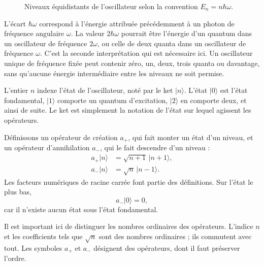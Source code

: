 \begin{figure}[t]
\centering
{}
\caption{Niveaux équidistants de l’oscillateur selon la convention \(E_n=n\hbar\omega\).}
\end{figure}

L’écart \(\hbar\omega\) correspond à l’énergie attribuée précédemment à un photon de fréquence angulaire \(\omega\). La valeur \(2\hbar\omega\) pourrait être l’énergie d’un quantum dans un oscillateur de fréquence \(2\omega\), ou celle de deux quanta dans un oscillateur de fréquence \(\omega\). C’est la seconde interprétation qui est nécessaire ici. Un oscillateur unique de fréquence fixée peut contenir zéro, un, deux, trois quanta ou davantage, sans qu’aucune énergie intermédiaire entre les niveaux ne soit permise.

L’entier \(n\) indexe l’état de l’oscillateur, noté par le ket \(|n\rangle\). L’état \(|0\rangle\) est l’état fondamental, \(|1\rangle\) comporte un quantum d’excitation, \(|2\rangle\) en comporte deux, et ainsi de suite. Le ket est simplement la notation de l’état sur lequel agissent les opérateurs.

Définissons un opérateur de création \(a_+\), qui fait monter un état d’un niveau, et un opérateur d’annihilation \(a_-\), qui le fait descendre d’un niveau :
\begin{align}
a_+|n\rangle &= \sqrt{n+1}\,|n+1\rangle,\\
a_-|n\rangle &= \sqrt{n}\,|n-1\rangle.
\end{align}
Les facteurs numériques de racine carrée font partie des définitions. Sur l’état le plus bas,
\begin{equation}
a_-|0\rangle=0,
\end{equation}
car il n’existe aucun état sous l’état fondamental.

Il est important ici de distinguer les nombres ordinaires des opérateurs. L’indice \(n\) et les coefficients tels que \(\sqrt n\) sont des nombres ordinaires ; ils commutent avec tout. Les symboles \(a_+\) et \(a_-\) désignent des opérateurs, dont il faut préserver l’ordre.

